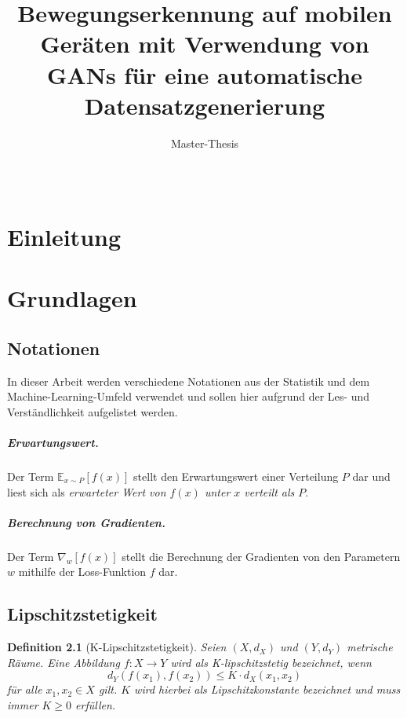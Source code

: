 \documentclass{hsflensburg}
\title{Bewegungserkennung auf mobilen Geräten mit Verwendung von GANs für eine
automatische Datensatzgenerierung}
\subtitle{Master-Thesis}
\author{
  \name{Florian Hansen}\\
  \institution{Hochschule Flensburg}
}
\newtheorem{definition}{Definition}
\begin{document}
  \maketitle
  \tableofcontents

  \chapter{Einleitung}

  \chapter{Grundlagen}
  \section{Notationen}
  In dieser Arbeit werden verschiedene Notationen aus der Statistik und dem
  Machine-Learning-Umfeld verwendet und sollen hier aufgrund der Les- und
  Verständlichkeit aufgelistet werden.

  \paragraph{Erwartungswert.}
  Der Term $\mathbb{E}_{x \sim P}\left[f(x)\right]$ stellt den Erwartungswert
  einer Verteilung $P$ dar und liest sich als \textit{erwarteter Wert von
  $f(x)$ unter $x$ verteilt als $P$}.

  \paragraph{Berechnung von Gradienten.}
  Der Term $\nabla_w\left[f(x)\right]$ stellt die Berechnung der Gradienten von
  den Parametern $w$ mithilfe der Loss-Funktion $f$ dar.

  \section{Lipschitzstetigkeit}
  \begin{definition}[K-Lipschitzstetigkeit]
    Seien $(X, d_X)$ und $(Y, d_Y)$ metrische Räume. Eine Abbildung $f: X \to Y$
    wird als K-lipschitzstetig bezeichnet, wenn
    \[
      d_Y(f(x_1), f(x_2)) \leq K \cdot d_X(x_1, x_2)
    \]
    für alle $x_1, x_2 \in X$ gilt. $K$ wird hierbei als Lipschitzkonstante
    bezeichnet und muss immer $K \geq 0$ erfüllen.
  \end{definition}
\end{document}
